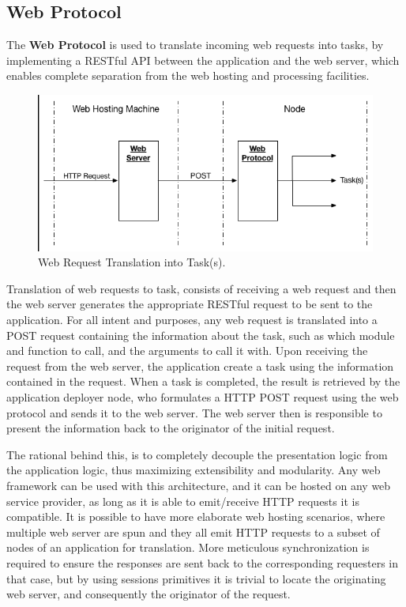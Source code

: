 \documentclass[12pt, titlepage]{uo_temp}
\begin{document}
     \subsection{Web Protocol}
     The \textbf{Web Protocol} is used to translate incoming web requests into tasks, by
     implementing a RESTful API between the application and the web server, which enables
     complete separation from the web hosting and processing facilities.
     
     \begin{figure}[h]
       \centering
       \includegraphics[width=125mm]{images/web_protocol.png}
       \caption{Web Request Translation into Task(s).}
     \end{figure}
     Translation of web requests to task, consists of receiving a web request and then the
     web server generates the appropriate RESTful request to be sent to the
     application. For all intent and purposes, any web request is translated into a POST
     request containing the information about the task, such as which module and function
     to call, and the arguments to call it with. Upon receiving the request from the web
     server, the application create a task using the information contained in the request.
     When a task is completed, the result is retrieved by the application deployer node,
     who formulates a HTTP POST request using the web protocol and sends it to the web
     server. The web server then is responsible to present the information back to the
     originator of the initial request.

     The rational behind this, is to completely decouple the presentation logic from the
     application logic, thus maximizing extensibility and modularity. Any web framework
     can be used with this architecture, and it can be hosted on any web service
     provider, as long as it is able to emit/receive HTTP requests it is compatible. 
     It is possible to have more elaborate web hosting scenarios, where multiple web
     server are spun and they all emit HTTP requests to a subset of nodes of an
     application for translation. More meticulous synchronization is required to ensure
     the responses are sent back to the corresponding requesters in that case, but by
     using sessions primitives it is trivial to locate the originating web server, and
     consequently the originator of the request.
     
\end{document}
